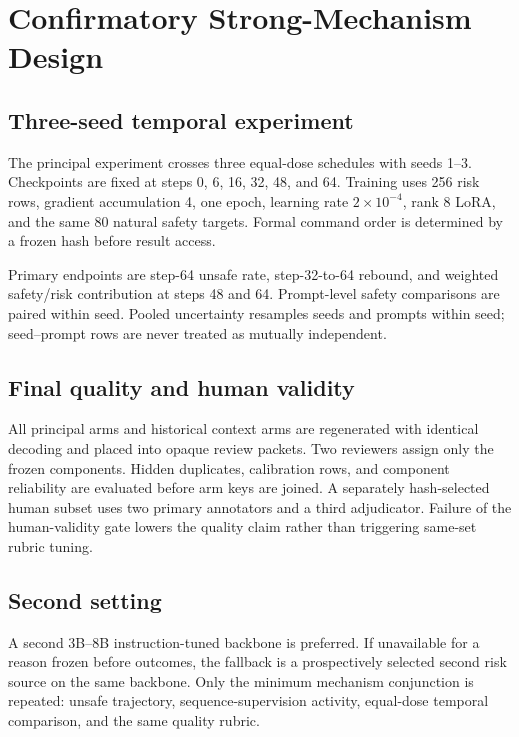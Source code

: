 \section{Confirmatory Strong-Mechanism Design}

\subsection{Three-seed temporal experiment}

The principal experiment crosses three equal-dose schedules with seeds 1--3. Checkpoints are fixed at steps 0, 6, 16, 32, 48, and 64. Training uses 256 risk rows, gradient accumulation 4, one epoch, learning rate $2\times10^{-4}$, rank 8 LoRA, and the same 80 natural safety targets. Formal command order is determined by a frozen hash before result access.

Primary endpoints are step-64 unsafe rate, step-32-to-64 rebound, and weighted safety/risk contribution at steps 48 and 64. Prompt-level safety comparisons are paired within seed. Pooled uncertainty resamples seeds and prompts within seed; seed--prompt rows are never treated as mutually independent.

\subsection{Final quality and human validity}

All principal arms and historical context arms are regenerated with identical decoding and placed into opaque review packets. Two reviewers assign only the frozen components. Hidden duplicates, calibration rows, and component reliability are evaluated before arm keys are joined. A separately hash-selected human subset uses two primary annotators and a third adjudicator. Failure of the human-validity gate lowers the quality claim rather than triggering same-set rubric tuning.

\subsection{Second setting}

A second 3B--8B instruction-tuned backbone is preferred. If unavailable for a reason frozen before outcomes, the fallback is a prospectively selected second risk source on the same backbone. Only the minimum mechanism conjunction is repeated: unsafe trajectory, sequence-supervision activity, equal-dose temporal comparison, and the same quality rubric.

